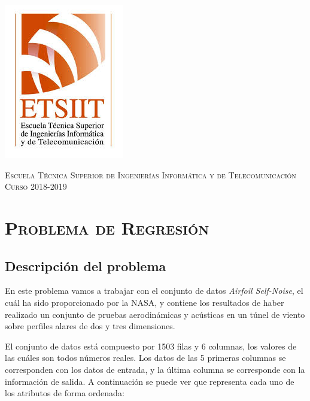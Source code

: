 \documentclass[11pt,a4paper]{article}
\begin{document}
\begin{titlepage}
\begin{minipage}{\textwidth}
\includegraphics[scale=0.3]{img/etsiit.jpeg}

\vspace{0.7cm}
\textsc{Escuela Técnica Superior de Ingenierías Informática y de Telecomunicación}\\
\vspace{1cm}
\textsc{Curso 2018-2019}
\end{minipage}
\end{titlepage}

\tableofcontents
\thispagestyle{empty}				%

\newpage

\setlength{\parskip}{1em}

\section{\textsc{Problema de Regresión}}

\subsection{Descripción del problema}

En este problema vamos a trabajar con el conjunto de datos \textit{Airfoil Self-Noise}, el cuál ha sido proporcionado por la NASA,
y contiene los resultados de haber realizado un conjunto de pruebas aerodinámicas y acústicas en un túnel de viento sobre perfiles
alares de dos y tres dimensiones.

El conjunto de datos está compuesto por 1503 filas y 6 columnas, los valores de las cuáles son todos números reales. Los datos de
las 5 primeras columnas se corresponden con los datos de entrada, y la última columna se corresponde con la información de salida.
A continuación se puede ver que representa cada uno de los atributos de forma ordenada:
\end{document}
